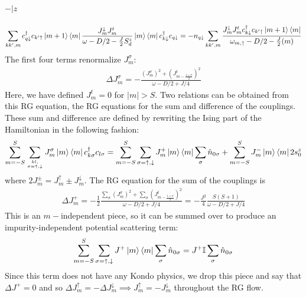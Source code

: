 \documentclass[12pt]{revtex4-2}
\begin{document}
\paragraph{\(-|z\)}
\begin{equation}\begin{aligned}
	\sum_{kk^\prime,m} c^\dagger_{q \downarrow} c_{k^\prime \uparrow} \ket{m+1}\bra{m}\frac{J^\downarrow_{m}{J^t_m}}{\omega - D/2 - \frac{J}{2}S_d^z}\ket{m}\bra{m} c^\dagger_{k \downarrow}c_{q \downarrow} = -n_{q \downarrow}\sum_{kk^\prime,m}\frac{J^\downarrow_{m} J^t_m c^\dagger_{k \downarrow}c_{k^\prime\uparrow} \ket{m+1}\bra{m}}{\omega_{m, \uparrow} - D/2 - \frac{J}{2}(m)}
\end{aligned}\end{equation}
The first four terms renormalize \(J^\sigma_m\):
\begin{equation}\begin{aligned}
	\Delta J^\sigma_{m} = -\frac{\left( J^\sigma_m \right) ^2 + \left( J^t_{m-\frac{1+\sigma}{2}} \right) ^2}{\omega - D/2 + J/4}
\end{aligned}\end{equation}
Here, we have defined \(J^t_m = 0\) for \( |m| > S\). Two relations can be obtained from this RG equation, the RG equations for the sum and difference of the couplings. These sum and difference are defined by rewriting the Ising part of the Hamiltonian in the following fashion:
\begin{equation}\begin{aligned}
	\sum_{m=-S}^S \sum_{kl,\atop{\sigma=\uparrow,\downarrow}} J^\sigma_m \ket{m}\bra{m} c^\dagger_{k \sigma}c_{l \sigma} = \sum_{m=-S}^S \sum_{\sigma=\uparrow,\downarrow} J^+_m \ket{m}\bra{m} \sum_\sigma \hat n_{0\sigma}  + \sum_{m=-S}^S J^-_m \ket{m}\bra{m} 2s^z_0
\end{aligned}\end{equation}
where \(2J^\pm_m = J^\uparrow_m \pm J^\downarrow_m\).
The RG equation for the sum of the couplings is
\begin{equation}\begin{aligned}
	\Delta J^+_m = -\frac{1}{2}\frac{\sum_\sigma \left( J^\sigma_m \right) ^2 + \sum_\sigma \left( J^t_{m-\frac{1+\sigma}{2}} \right) ^2}{\omega - D/2 + J/4} = -\frac{J^2}{4}\frac{S(S+1)}{\omega - D/2 + J/4}
\end{aligned}\end{equation}
This is an \(m-\)independent piece, so it can be summed over to produce an impurity-independent potential scattering term:
\begin{equation}\begin{aligned}
	\sum_{m=-S}^S \sum_{\sigma=\uparrow,\downarrow} J^+ \ket{m}\bra{m} \sum_\sigma \hat n_{0\sigma} = J^+ \mathbb{I}\sum_\sigma \hat n_{0\sigma}
\end{aligned}\end{equation}
Since this term does not have any Kondo physics, we drop this piece and say that \(\Delta J^+ = 0\) and so \(\Delta J^\uparrow_m = - \Delta J^\downarrow_m \implies J^\uparrow_m = -J^\downarrow_m\) throughout the RG flow.
\end{document}
